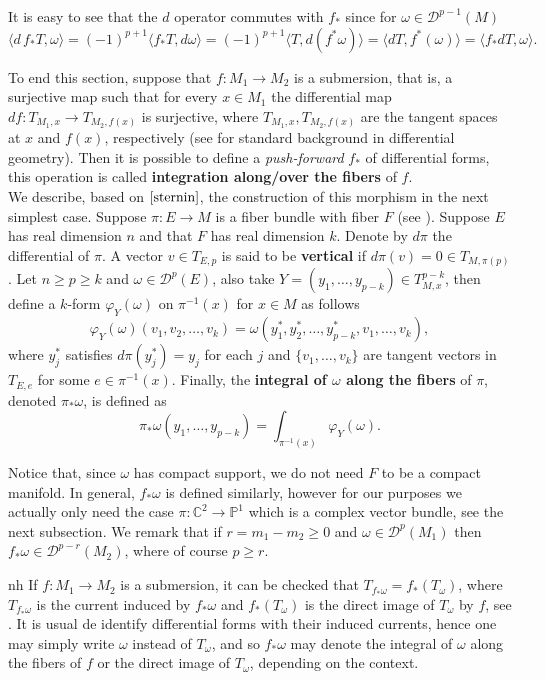 It is easy to see that the $d$ operator commutes with $f_*$ since for $\omega \in \mathcal{D}^{p-1}(M)$
$$\langle d \, f_*T ,\omega \rangle =(-1)^{p+1} \langle f_*T,d\omega \rangle = (-1)^{p+1} \langle T,d(f^*\omega) \rangle = \langle dT,f^*(\omega) \rangle = \langle f_*dT,\omega \rangle.$$

To end this section, suppose that $f:M_1 \rightarrow M_2$ is a submersion, that is, a surjective map such that for every $x\in M_1$ the differential map $d f : T_{M_1,x} \rightarrow T_{M_2,f(x)}$ is surjective, where $T_{M_1,x},T_{M_2,f(x)}$ are the tangent spaces at $x$ and $f(x)$, respectively (see \cite{epstein} for standard background in differential geometry). Then it is possible to define a \emph{push-forward} $f_*$ of differential forms, this operation is called {\bf integration along/over the fibers} of $f$.\\

We describe, based on $\cite{sternin}$, the construction of this morphism in the next simplest case. Suppose $\pi:E \rightarrow M$ is a fiber bundle with fiber $F$ (see \cite{bott}). Suppose $E$ has real dimension $n$ and that $F$ has real dimension $k$. Denote by $d\pi$ the differential of $\pi$. A vector $v\in T_{E,p}$ is said to be {\bf vertical} if $d\pi(v)=0\in T_{M,\pi(p)}$. Let $n\geq p \geq k$ and $\omega\in \mathcal{D}^p(E)$, also take $Y=(y_1,\dots,y_{p-k})\in T_{M,x}^{p-k}$, then define a $k$-form $\varphi_Y(\omega)$ on $\pi^{-1}(x)$ for $x\in M$ as follows
$$\varphi_Y(\omega)(v_1,v_2,\dots,v_k) = \omega(y_1^*,y_2^*,\dots,y_{p-k}^*,v_1,\dots,v_k),$$
where $y_j^*$ satisfies $d\pi(y_j^*)=y_j$ for each $j$ and $\{v_1,\dots,v_k\}$ are tangent vectors in $T_{E,e}$ for some $e\in \pi^{-1}(x)$. Finally, the {\bf integral of $\omega$ along the fibers} of $\pi$, denoted $\pi_*\omega$, is defined as
\begin{equation}\label{integral_along}
\pi_*\omega(y_1,\dots,y_{p-k}) = \int_{\pi^{-1}(x)} \varphi_Y(\omega).
\end{equation}

Notice that, since $\omega$ has compact support, we do not need $F$ to be a compact manifold. In general, $f_*\omega$ is defined similarly, however for our purposes we actually only need the case $\pi:\mathbb{C}^2\rightarrow \mathbb{P}^1$ which is a complex vector bundle, see the next subsection. We remark that if $r=m_1-m_2\geq 0$ and $\omega \in \mathcal{D}^{p}(M_1)$ then $f_*\omega\in \mathcal{D}^{p-r}(M_2)$, where of course $p\geq r$. 

\begin{myrmk}{}{nh} 
If $f:M_1\rightarrow M_2$ is a submersion, it can be checked that $T_{f_*\omega} = f_*(T_{\omega})$, where $T_{f_*\omega}$ is the current induced by $f_*\omega$ and $f_*(T_{\omega})$ is the direct image of $T_{\omega}$ by $f$, see \cite[(2.15) Special case]{demailly}. It is usual de identify differential forms with their induced currents, hence one may simply write $\omega$ instead of $T_\omega$, and so $f_*\omega$ may denote the integral of $\omega$ along the fibers of $f$ or the direct image of $T_\omega$, depending on the context.
\end{myrmk}

